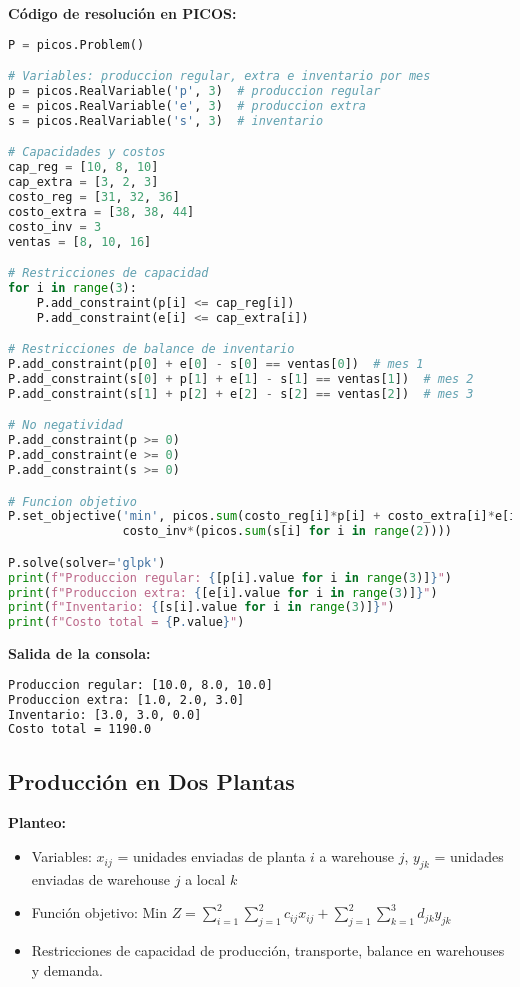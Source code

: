 \documentclass[12pt]{article}
\begin{document}
\textbf{Código de resolución en PICOS:}
\begin{lstlisting}[language=Python]
P = picos.Problem()

# Variables: produccion regular, extra e inventario por mes
p = picos.RealVariable('p', 3)  # produccion regular
e = picos.RealVariable('e', 3)  # produccion extra
s = picos.RealVariable('s', 3)  # inventario

# Capacidades y costos
cap_reg = [10, 8, 10]
cap_extra = [3, 2, 3]
costo_reg = [31, 32, 36]
costo_extra = [38, 38, 44]
costo_inv = 3
ventas = [8, 10, 16]

# Restricciones de capacidad
for i in range(3):
    P.add_constraint(p[i] <= cap_reg[i])
    P.add_constraint(e[i] <= cap_extra[i])

# Restricciones de balance de inventario
P.add_constraint(p[0] + e[0] - s[0] == ventas[0])  # mes 1
P.add_constraint(s[0] + p[1] + e[1] - s[1] == ventas[1])  # mes 2
P.add_constraint(s[1] + p[2] + e[2] - s[2] == ventas[2])  # mes 3

# No negatividad
P.add_constraint(p >= 0)
P.add_constraint(e >= 0)
P.add_constraint(s >= 0)

# Funcion objetivo
P.set_objective('min', picos.sum(costo_reg[i]*p[i] + costo_extra[i]*e[i] for i in range(3)) + 
                costo_inv*(picos.sum(s[i] for i in range(2))))

P.solve(solver='glpk')
print(f"Produccion regular: {[p[i].value for i in range(3)]}")
print(f"Produccion extra: {[e[i].value for i in range(3)]}")
print(f"Inventario: {[s[i].value for i in range(3)]}")
print(f"Costo total = {P.value}")
\end{lstlisting}

\textbf{Salida de la consola:}
\begin{lstlisting}[language=bash,backgroundcolor=\color{black},basicstyle=\color{white}\ttfamily,numbers=none]
Produccion regular: [10.0, 8.0, 10.0]
Produccion extra: [1.0, 2.0, 3.0]
Inventario: [3.0, 3.0, 0.0]
Costo total = 1190.0
\end{lstlisting}

\subsection{Producción en Dos Plantas}

\textbf{Planteo:}
\begin{itemize}
\item Variables: $x_{ij}$ = unidades enviadas de planta $i$ a warehouse $j$, $y_{jk}$ = unidades enviadas de warehouse $j$ a local $k$
\item Función objetivo: Min $Z = \sum_{i=1}^2 \sum_{j=1}^2 c_{ij}x_{ij} + \sum_{j=1}^2 \sum_{k=1}^3 d_{jk}y_{jk}$
\item Restricciones de capacidad de producción, transporte, balance en warehouses y demanda.
\end{itemize}
\end{document}
